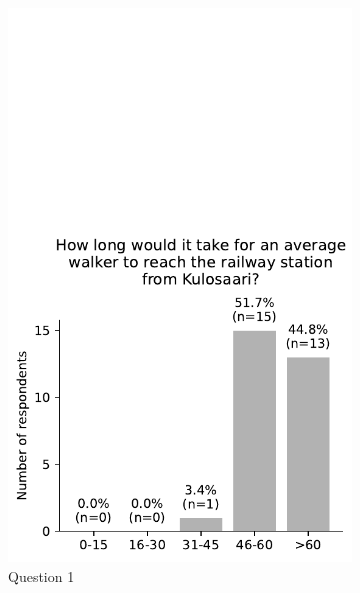 \begin{figure}[H]
	\centering
	\begin{subfigure}[b]{0.5\textwidth}
		\centering
		\includegraphics[width=\textwidth]{images/questionnaire/0.pdf}
		\caption{Question 1}
		\label{fig:Question 1}
	\end{subfigure}%
	\hfill
	\begin{subfigure}[b]{0.5\textwidth}
		\centering

\end{subfigure}
\end{figure}
